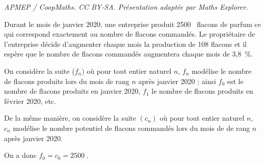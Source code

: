 \documentclass[10pt]{article}
\providecommand{\np}[2][]{{#2~#1}}
\begin{document}
\noindent\textit{APMEP / CoopMaths. CC BY-SA. Présentation adaptée par Maths Explorer.}\par\medskip
\medskip

Durant le mois de janvier 2020, une entreprise produit \np{2500} flacons de parfum ce qui correspond exactement au nombre de flacons commandés. Le propriétaire de l’entreprise décide d’augmenter chaque mois la production de 108 flacons et il espère que le nombre de flacons commandés augmentera chaque mois de 3,8 \,\%.

On considère la suite ($f_n)$ où pour tout entier naturel $n$, $f_n$ modélise le nombre de flacons produits lors du mois de rang $n$ après janvier 2020 ; ainsi $f_0$ est le nombre de flacons produits en janvier 2020, $f_1$ le nombre de flacons produits en février 2020, etc.

De la même manière, on considère la suite $(c_n)$ où pour tout entier naturel $n$, $c_n$ modélise le nombre potentiel de flacons commandés lors du mois de de rang $n $ après janvier 2020.

On a donc $f_0 = c_0 = \np{2 500}$.

\medskip
\end{document}
